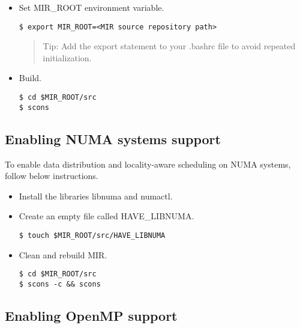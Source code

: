 \documentclass[11pt,a4paper]{article}
\begin{document}
\begin{itemize}
    \item Set MIR\_ROOT environment variable.

\begin{lstlisting}[style=MyInputStyle]
$ export MIR_ROOT=<MIR source repository path>
\end{lstlisting}

\begin{framed}
\begin{quote}
Tip: Add the export statement to your \textsf{.bashrc} file to avoid repeated initialization.
\end{quote}
\end{framed}

    \item Build.

\begin{lstlisting}[style=MyInputStyle]
$ cd $MIR_ROOT/src
$ scons
\end{lstlisting}
\end{itemize}

\subsection{Enabling NUMA systems support}\label{sec:enabling-numa-systems-support}

To enable data distribution and locality-aware scheduling on NUMA systems, follow below instructions.

\begin{itemize}
    \item Install the libraries libnuma and numactl.
    \item Create an empty file called \textsf{HAVE\_LIBNUMA}.

\begin{lstlisting}[style=MyInputStyle]
$ touch $MIR_ROOT/src/HAVE_LIBNUMA
\end{lstlisting}

    \item Clean and rebuild MIR.

\begin{lstlisting}[style=MyInputStyle]
$ cd $MIR_ROOT/src
$ scons -c && scons
\end{lstlisting}
\end{itemize}

\subsection{Enabling OpenMP support}\label{sec:enable-omp-support}
\end{document}
